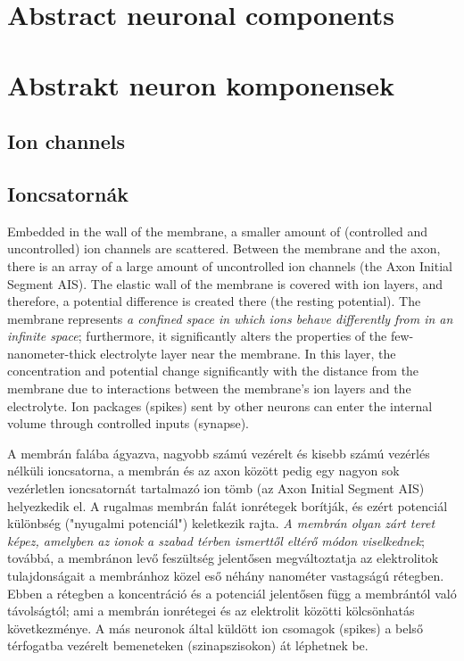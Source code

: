 
\ifx\magyar\undefined
\chapter[Abstract neuronal components]{Abstract neuronal components\label{sec:Modell-Components}}
\else
\chapter[Abstrakt neuron komponensek]{Abstrakt neuron komponensek\label{sec:Modell-Components}}
\fi

\iflatexml
\else
\minitoc
\fi



\ifx\magyar\undefined
\section[Ion channels]{Ion channels \label{sec:AbstractIon channels}}
\else
\section[Ioncsatornák]{Ioncsatornák \label{sec:AbstractIon channels}}
\fi

\ifx\magyar\undefined
Embedded in the wall of the membrane, a smaller amount of (controlled 
and uncontrolled) ion channels are scattered.
Between the membrane and the axon, there is an array of a large amount of uncontrolled ion channels (the Axon Initial Segment \gls{AIS}). 
The elastic wall of the membrane is covered with ion layers, and therefore, a potential difference is created there (the resting potential).
The membrane represents \textit{a confined space in which ions behave differently from in an infinite space}; furthermore, it significantly alters the properties of the few-nanometer-thick electrolyte layer near the membrane. In this layer, the concentration and potential change significantly with the distance from the membrane due to interactions between the membrane's ion layers and the electrolyte.
Ion packages (spikes) sent by other neurons can enter the internal volume through controlled inputs (synapse).

\else

A membrán falába ágyazva, nagyobb számú vezérelt és kisebb számú vezérlés nélküli ioncsatorna, a membrán és az axon között
pedig egy nagyon sok vezérletlen ioncsatornát tartalmazó ion tömb 
(az Axon Initial Segment \gls{AIS}) helyezkedik el.
A rugalmas membrán falát ionrétegek borítják, és ezért
potenciál különbség ("nyugalmi potenciál") keletkezik rajta.
\textit{A membrán olyan zárt teret képez, amelyben az ionok a szabad térben
ismerttől eltérő módon viselkednek}; továbbá, a membránon levő feszültség jelentősen megváltoztatja az elektrolitok tulajdonságait a 
membránhoz közel eső néhány nanométer vastagságú rétegben. 
Ebben a rétegben a koncentráció és a potenciál jelentősen függ
a membrántól való távolságtól; ami a membrán ionrétegei és az
elektrolit közötti kölcsönhatás következménye.
A más neuronok által küldött ion csomagok (spikes) a belső térfogatba
vezérelt bemeneteken (szinapszisokon)  át léphetnek be.

\fi

